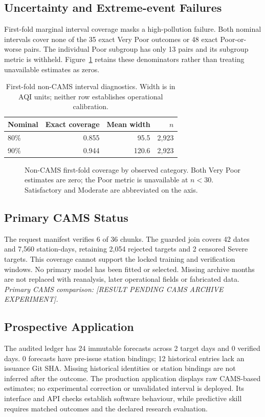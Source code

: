 \subsection{Uncertainty and Extreme-event Failures}
First-fold marginal interval coverage masks a high-pollution failure.
Both nominal intervals cover none of the 35 exact Very Poor outcomes or
48 exact Poor-or-worse pairs. The individual Poor subgroup has only 13 pairs
and its subgroup metric is withheld. Figure~\ref{fig:coverage} retains these
denominators rather than treating unavailable estimates as zeros.
\begin{table}[t]\centering\footnotesize
\caption{First-fold non-CAMS interval diagnostics. Width is in AQI units; neither row establishes operational calibration.}
\label{tab:coverage}
\setlength{\tabcolsep}{4pt}
\begin{tabular}{lrrr}
\toprule
Nominal & Exact coverage & Mean width & $n$\\\midrule
80\% & 0.855 & 95.5 & 2,923\\
90\% & 0.944 & 120.6 & 2,923\\
\bottomrule\end{tabular}
\end{table}
\begin{figure}[t]\centering\AirGuardCoverage
\caption{Non-CAMS first-fold coverage by observed category. Both Very Poor
estimates are zero; the Poor metric is unavailable at $n<30$. Satisfactory and
Moderate are abbreviated on the axis.}\label{fig:coverage}\end{figure}

\subsection{Primary CAMS Status}
The request manifest verifies 6 of 36 chunks. The guarded join covers 42 dates and 7,560 station-days, retaining 2,054 rejected targets and 2 censored Severe targets. This coverage cannot support the locked training and verification
windows. No primary model has been fitted or selected. Missing archive months
are not replaced with reanalysis, later operational fields or fabricated data.
\textit{Primary CAMS comparison: [RESULT PENDING CAMS ARCHIVE EXPERIMENT].}

\subsection{Prospective Application}
The audited ledger has 24 immutable forecasts across 2 target days and 0 verified days. 0 forecasts have pre-issue station bindings; 12 historical entries lack an issuance Git SHA. Missing historical identities or station bindings are not inferred
after the outcome. The production application displays raw CAMS-based estimates;
no experimental correction or unvalidated interval is deployed. Its interface
and API checks establish software behaviour, while predictive skill requires
matched outcomes and the declared research evaluation.
